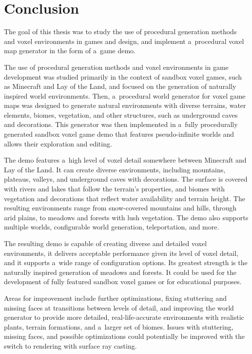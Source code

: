 \chapter{Conclusion}\label{conclusion}

The goal of this thesis was to study the use of procedural generation methods and voxel environments in games and design, and implement a~procedural voxel map generator in the form of a~game demo.

The use of procedural generation methods and voxel environments in game development was studied primarily in the context of sandbox voxel games, such as Minecraft and Lay of the Land, and focused on the generation of naturally inspired world environments. Then, a~procedural world generator for voxel game maps was designed to generate natural environments with diverse terrains, water elements, biomes, vegetation, and other structures, such as underground caves and decorations. This generator was then implemented in a~fully procedurally generated sandbox voxel game demo that features pseudo-infinite worlds and allows their exploration and editing.

The demo features a~high level of voxel detail somewhere between Minecraft and Lay of the Land. It can create diverse environments, including mountains, plateaus, valleys, and underground caves with decorations. The surface is covered with rivers and lakes that follow the terrain's properties, and biomes with vegetation and decorations that reflect water availability and terrain height. The resulting environments range from snow-covered mountains and hills, through arid plains, to meadows and forests with lush vegetation. The demo also supports multiple worlds, configurable world generation, teleportation, and more. 

The resulting demo is capable of creating diverse and detailed voxel environments, it delivers acceptable performance given its level of voxel detail, and it supports a~wide range of configuration options. Its greatest strength is the naturally inspired generation of meadows and forests. It could be used for the development of fully featured sandbox voxel games or for educational purposes.

Areas for improvement include further optimizations, fixing stuttering and missing faces at transitions between levels of detail, and improving the world generator to provide more detailed, real-life-accurate environments with realistic plants, terrain formations, and a~larger set of biomes. Issues with stuttering, missing faces, and possible optimizations could potentially be improved with the switch to rendering with surface ray casting.
